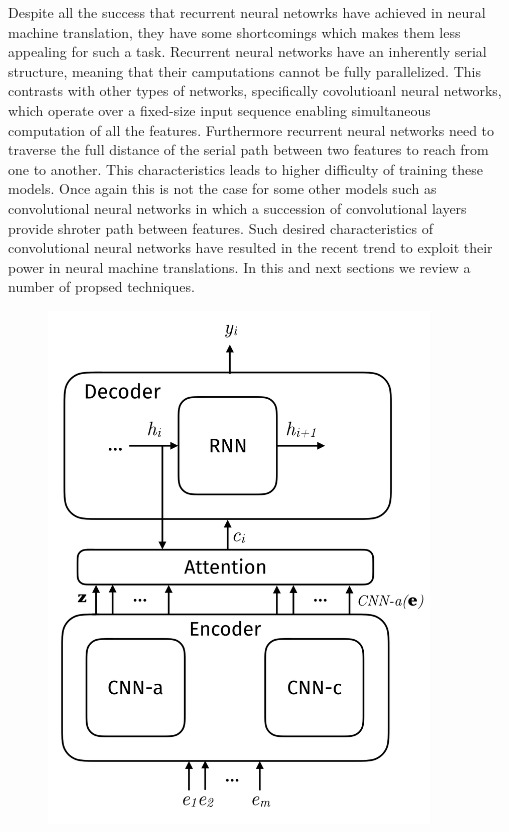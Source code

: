 \documentclass[a4paper]{article}
\begin{document}
Despite all the success that recurrent neural  netowrks  have achieved in neural
machine translation, they have some shortcomings which makes them less appealing
for such a task. Recurrent neural networks have an inherently serial  structure,
meaning that their  camputations  cannot  be  fully parallelized. This contrasts
with  other types of networks, specifically covolutioanl neural  networks, which
operate  over a  fixed-size input sequence enabling simultaneous computation  of
all the features. Furthermore  recurrent  neural networks need  to traverse  the
full distance of  the serial  path  between  two features  to reach from one  to
another. This characteristics  leads  to  higher  difficulty  of  training these
models. Once  again  this  is  not  the  case  for some  other  models  such  as
convolutional neural networks in  which  a succession  of  convolutional  layers
provide shroter  path  between features.  \cite{DBLP:journals/corr/GehringAGD16}
Such  desired characteristics  of convolutional neural networks have resulted in
the recent trend to exploit their power in neural machine  translations. In this
and next sections we review a number of propsed techniques.

\begin{figure}
  \center
  \includegraphics[width=0.9\textwidth]{img/CE}
\end{figure}
\end{document}
